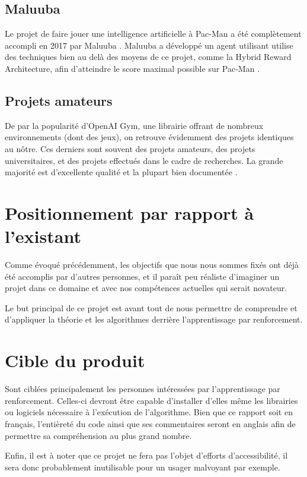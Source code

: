 \subsection{Maluuba}
Le projet de faire jouer une intelligence artificielle à Pac-Man a été complètement accompli en 2017 par Maluuba \cite{maluuba}.
Maluuba a développé un agent utilisant utilise des techniques bien au delà des moyens de ce projet, comme la Hybrid Reward Architecture, afin d'atteindre le score maximal possible sur Pac-Man \cite{hra}.

\subsection{Projets amateurs}
De par la popularité d'OpenAI Gym, une librairie offrant de nombreux environnements (dont des jeux), on retrouve évidemment des projets identiques au nôtre. Ces derniers sont souvent des projets amateurs, des projets universitaires, et des projets effectués dans le cadre de recherches. La grande majorité est d’excellente qualité et la plupart bien documentée \cite{pacmanai1,pacmanai2,pacmanai3}.


\section{Positionnement par rapport à l'existant}
Comme évoqué précédemment, les objectifs que nous nous sommes fixés ont déjà été accomplis par d’autres personnes, et il paraît peu réaliste d’imaginer un projet dans ce domaine et avec nos compétences actuelles qui serait novateur.
\par
Le but principal de ce projet est avant tout de nous permettre de comprendre et d’appliquer la théorie et les algorithmes derrière l’apprentissage par renforcement.

\section{Cible du produit}
Sont ciblées principalement les personnes intéressées par l’apprentissage par renforcement. Celles-ci devront être capable d’installer d’elles même les librairies ou logiciels nécessaire à l'exécution de l’algorithme. Bien que ce rapport soit en français, l'entièreté du code ainsi que ses commentaires seront en anglais afin de permettre sa compréhension au plus grand nombre.
\par
Enfin, il est à noter que ce projet ne fera pas l’objet d’efforts d’accessibilité, il sera donc probablement inutilisable pour un usager malvoyant par exemple.


